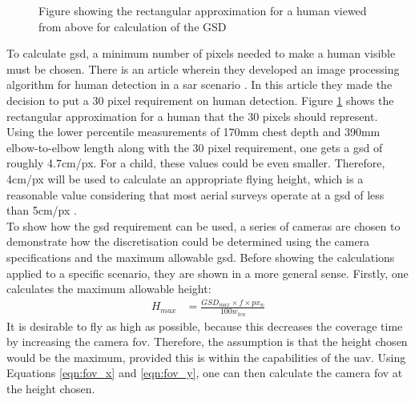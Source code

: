 \begin{figure}
	\caption{Figure showing the rectangular approximation for a human viewed from above for calculation of the GSD}
	\label{fig:GSD}
\end{figure}
To calculate \acs{gsd}, a minimum number of pixels needed to make a human visible must be chosen. There is an article wherein they developed an image processing algorithm for human detection in a \acl{sar} scenario \cite{Rudol2008}. In this article they made the decision to put a 30 pixel requirement on human detection.
Figure \ref{fig:GSD} shows the rectangular approximation for a human that the 30 pixels should represent.\\
Using the lower percentile measurements of 170mm chest depth and 390mm elbow-to-elbow length along with the 30 pixel requirement, one gets a \acs{gsd} of roughly 4.7cm/px. For a child, these values could be even smaller. Therefore, 4cm/px will be used to calculate an appropriate flying height, which is a reasonable value considering that most aerial surveys operate at a \acs{gsd} of less than 5cm/px \cite{PropellerAero2021}.\\
To show how the \acs{gsd} requirement can be used, a series of cameras are chosen to demonstrate how the discretisation could be determined using the camera specifications and the maximum allowable \acs{gsd}. Before showing the calculations applied to a specific scenario, they are shown in a more general sense. Firstly, one calculates the maximum allowable height:
\begin{equation}
	\label{eqn:height_calculation}
	\begin{aligned}
		H_{max} &= \frac{GSD_{max} \times f \times px_w}{100w_{len}}
	\end{aligned}
\end{equation}
It is desirable to fly as high as possible, because this decreases the coverage time by increasing the camera \acl{fov}. Therefore, the assumption is that the height chosen would be the maximum, provided this is within the capabilities of the \acs{uav}. Using Equations \ref{eqn:fov_x} and \ref{eqn:fov_y}, one can then calculate the camera \acs{fov} at the height chosen.\\
